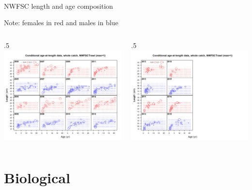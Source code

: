 \documentclass[ignorenonframetext,]{beamer}
\def\begincols{\begin{columns}}
\def\begincol{\begin{column}}
\def\endcol{\end{column}}
\def\endcols{\end{columns}}
\begin{document}
\begin{frame}{NWFSC length and age composition}

Note: females in red and males in blue \begincols
 \begincol{.5\textwidth}
\includegraphics[height=.5\textheight]{r4ss/plots_mod1/comp_condAALdat_bubflt8mkt0_page1.png}
\endcol
 \begincol{.5\textwidth}
\includegraphics[height=.5\textheight]{r4ss/plots_mod1/comp_condAALdat_bubflt8mkt0_page2.png}
\endcol
\endcols

\end{frame}

\section{Biological}\label{biological}
\end{document}
